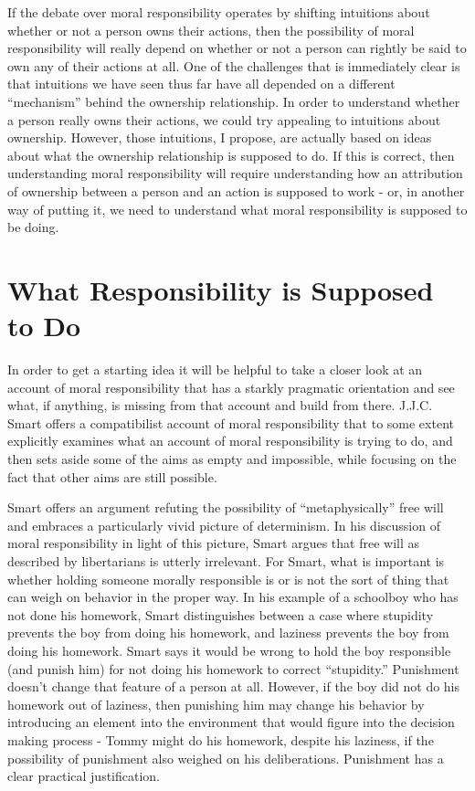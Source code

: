 \documentclass[phd,12pt,oneside,paper=letterpaper]{ubcthesis}
\begin{document}
If the debate over moral responsibility operates by shifting intuitions about whether or not a person owns their actions, then the possibility of moral responsibility will really depend on whether or not a person can rightly be said to own any of their actions at all. One of the challenges that is immediately clear is that intuitions we have seen thus far have all depended on a different ``mechanism'' behind the ownership relationship. In order to understand whether a person really owns their actions, we could try appealing to intuitions about ownership. However, those intuitions, I propose, are actually based on ideas about what the ownership relationship is supposed to do. If this is correct, then understanding moral responsibility will require understanding how an attribution of ownership between a person and an action is supposed to work - or, in another way of putting it, we need to understand what moral responsibility is supposed to be doing. 

\section{What Responsibility is Supposed to Do}
In order to get a starting idea it will be helpful to take a closer look at an account of moral responsibility that has a starkly pragmatic orientation and see what, if anything, is missing from that account and build from there. J.J.C. Smart \citeyearpar{smart1961} offers a compatibilist account of moral responsibility that to some extent explicitly examines what an account of moral responsibility is trying to do, and then sets aside some of the aims as empty and impossible, while focusing on the fact that other aims are still possible. 

Smart offers an argument refuting the possibility of ``metaphysically'' free will and embraces a particularly vivid picture of determinism. In his discussion of moral responsibility in light of this picture, Smart argues that free will as described by libertarians is utterly irrelevant. For Smart, what is important is whether holding someone morally responsible is or is not the sort of thing that can weigh on behavior in the proper way. In his example of a schoolboy who has not done his homework, Smart distinguishes between a case where stupidity prevents the boy from doing his homework, and laziness prevents the boy from doing his homework. Smart says it would be wrong to hold the boy responsible (and punish him) for not doing his homework to correct ``stupidity.'' Punishment doesn't change that feature of a person at all. However, if the boy did not do his homework out of laziness, then punishing him may change his behavior by introducing an element into the environment that would figure into the decision making process - Tommy might do his homework, despite his laziness, if the possibility of punishment also weighed on his deliberations. Punishment has a clear practical justification.
\end{document}
